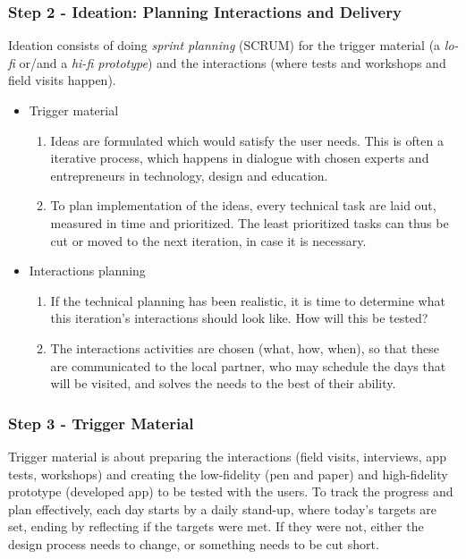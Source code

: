 \subsubsection{Step 2 - Ideation: Planning Interactions and Delivery}
  Ideation consists of doing \textit{sprint planning} (SCRUM) for the trigger material (a \textit{lo-fi} or/and a \textit{hi-fi prototype}) and the interactions (where tests and workshops and field visits happen).

    \begin{itemize}
    \item Trigger material
      \begin{enumerate}
      \item Ideas are formulated which would satisfy the user needs. This is often a iterative process, which happens in dialogue with chosen experts and entrepreneurs in technology, design and education.
      \item To plan implementation of the ideas, every technical task are laid out, measured in time and prioritized. The least prioritized tasks can thus be cut or moved to the next iteration, in case it is necessary.
      \end{enumerate}
    \item Interactions planning
      \begin{enumerate}
      \item If the technical planning has been realistic, it is time to determine what this iteration's interactions should look like. How will this be tested?
      \item The interactions activities are chosen (what, how, when), so that these are communicated to the local partner, who may schedule the days that will be visited, and solves the needs to the best of their ability.
      \end{enumerate}
    \end{itemize}

  \subsubsection{Step 3 - Trigger Material}
  Trigger material is about preparing the interactions (field visits, interviews, app tests, workshops) and creating the low-fidelity (pen and paper) and high-fidelity prototype (developed app) to be tested with the users. To track the progress and plan effectively, each day starts by a daily stand-up, where today's targets are set, ending by reflecting if the targets were met. If they were not, either the design process needs to change, or something needs to be cut short.

